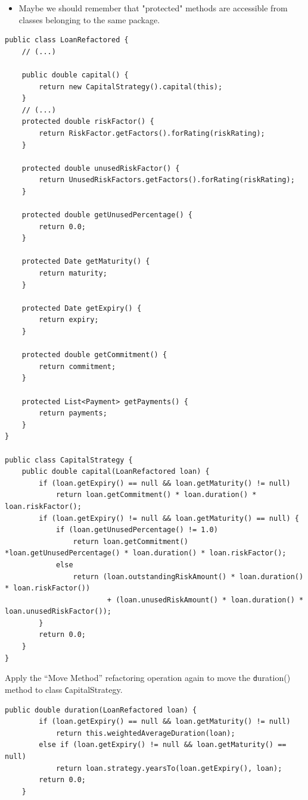\documentclass[a4paper,11pt]{memoir}
\newcommand{\code}[1]{{\texttt #1}}
\begin{document}
\begin{solution}
	\begin{itemize}
		\item Maybe we should remember that "protected" methods are accessible from classes belonging to the same package.
	\end{itemize}
	
	
\begin{lstlisting}[caption=cap,label=lst:label]
public class LoanRefactored {
    // (...)

    public double capital() {
        return new CapitalStrategy().capital(this);
    }
    // (...)
    protected double riskFactor() {
        return RiskFactor.getFactors().forRating(riskRating);
    }

    protected double unusedRiskFactor() {
        return UnusedRiskFactors.getFactors().forRating(riskRating);
    }

    protected double getUnusedPercentage() {
        return 0.0;
    }

    protected Date getMaturity() {
        return maturity;
    }

    protected Date getExpiry() {
        return expiry;
    }

    protected double getCommitment() {
        return commitment;
    }

    protected List<Payment> getPayments() {
        return payments;
    }
}

public class CapitalStrategy {
    public double capital(LoanRefactored loan) {
        if (loan.getExpiry() == null && loan.getMaturity() != null)
            return loan.getCommitment() * loan.duration() * loan.riskFactor();
        if (loan.getExpiry() != null && loan.getMaturity() == null) {
            if (loan.getUnusedPercentage() != 1.0)
                return loan.getCommitment() *loan.getUnusedPercentage() * loan.duration() * loan.riskFactor();
            else
                return (loan.outstandingRiskAmount() * loan.duration() * loan.riskFactor())
                        + (loan.unusedRiskAmount() * loan.duration() * loan.unusedRiskFactor());
        }
        return 0.0;
    }
}
\end{lstlisting}
\end{solution}

\begin{exercise}
	Apply the ``Move Method'' refactoring operation again to move the \code{duration()} method to class \code{CapitalStrategy}. 
\end{exercise}
\begin{solution}
\begin{lstlisting}[caption={duration() method},label=lst:lab]
    public double duration(LoanRefactored loan) {
        if (loan.getExpiry() == null && loan.getMaturity() != null)
            return this.weightedAverageDuration(loan);
        else if (loan.getExpiry() != null && loan.getMaturity() == null)
            return loan.strategy.yearsTo(loan.getExpiry(), loan);
        return 0.0;
    }
\end{lstlisting}
\end{solution}
\end{document}

